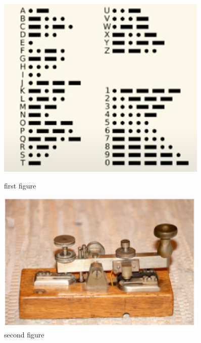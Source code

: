 \begin{figure}
    \centering
    \begin{minipage}{0.45\textwidth}
        \centering
        \includegraphics[width=0.9\textwidth]{lesson1/morse.eps} %
        \caption{first figure}
    \end{minipage}\hfill
    \begin{minipage}{0.45\textwidth}
        \centering
        \includegraphics[width=0.9\textwidth]{lesson1/morsekey.eps} %
        \caption{second figure}
    \end{minipage}
\end{figure}
\fi


